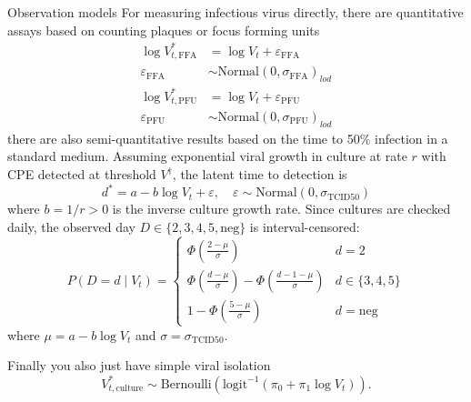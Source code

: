\documentclass[9pt, aspectratio=169]{beamer}
\begin{document}
\begin{frame}{Observation models}
For measuring infectious virus directly, there are quantitative assays based on counting plaques or focus forming units
\begin{align*}
    \log V^{*}_{t,\text{FFA}} &= \log V_t + \varepsilon_{\text{FFA}} \\
    \varepsilon_{\text{FFA}} &\sim \text{Normal}(0, \sigma_{\text{FFA}})_{lod} \\
    \log V^{*}_{t,\text{PFU}} &= \log V_t + \varepsilon_{\text{PFU}} \\
    \varepsilon_{\text{PFU}} &\sim \text{Normal}(0, \sigma_{\text{PFU}})_{lod}
\end{align*}
there are also semi-quantitative results based on the time to 50\% infection in a standard medium.
Assuming exponential viral growth in culture at rate $r$ with CPE detected at threshold $V^{\dagger}$, the latent time to detection is
\begin{equation*}
    d^{*} = a - b \log V_t + \varepsilon, \quad \varepsilon \sim \text{Normal}(0, \sigma_{\text{TCID50}})
\end{equation*}
where $b = 1/r > 0$ is the inverse culture growth rate.
Since cultures are checked daily, the observed day $D \in \{2,3,4,5,\text{neg}\}$ is interval-censored:
\begin{equation*}
    P(D = d \mid V_t) = \begin{cases}
        \Phi\!\left(\frac{2 - \mu}{\sigma}\right) & d = 2 \\
        \Phi\!\left(\frac{d - \mu}{\sigma}\right) - \Phi\!\left(\frac{d-1 - \mu}{\sigma}\right) & d \in \{3,4,5\} \\
        1 - \Phi\!\left(\frac{5 - \mu}{\sigma}\right) & d = \text{neg}
    \end{cases}
\end{equation*}
where $\mu = a - b \log V_t$ and $\sigma = \sigma_{\text{TCID50}}$.

Finally you also just have simple viral isolation
    \begin{equation*}
    V^{*}_{t,\text{culture}} \sim \text{Bernoulli}(\text{logit}^{-1}(\pi_0 + \pi_1 \log V_t)).
\end{equation*}
\end{frame}
\end{document}

